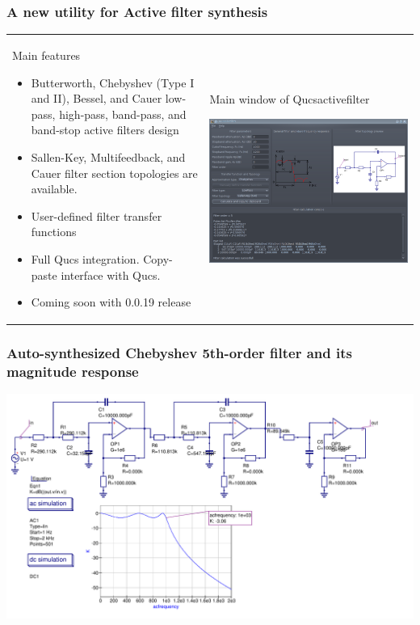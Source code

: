 \documentclass[9pt]{beamer}
\begin{document}
\begin{frame}
 \frametitle{A new utility for Active filter synthesis}
\begin{tabular}{p{}p{}}
\small
 Main features 
 \begin{itemize}
  \item Butterworth, Chebyshev (Type I and II), Bessel, and Cauer low-pass, 
high-pass, band-pass, and band-stop active filters design
  \item Sallen-Key, Multifeedback, and Cauer filter section topologies are 
available.
  \item User-defined filter transfer functions
  \item Full Qucs integration. Copy-paste interface with Qucs.
  \item Coming soon with 0.0.19 release
 \end{itemize}
 &

 Main window of Qucsactivefilter
 
  \includegraphics[width=0.65\columnwidth]{img/actfilt-win.png}
 \\
\end{tabular}
\end{frame}


\begin{frame}
 \frametitle{Auto-synthesized Chebyshev 5th-order filter  and its 
magnitude response}
\includegraphics[width=1.1\textwidth]{img/actfilt.pdf}
\end{frame}
\end{document}
